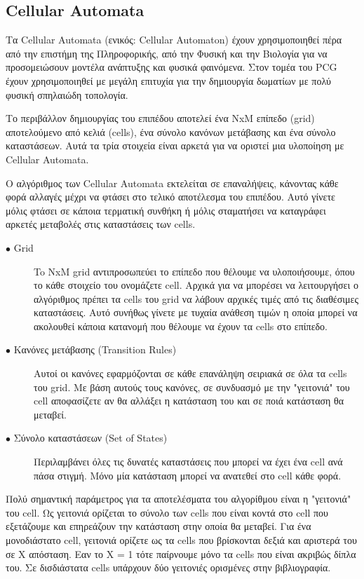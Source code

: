 \subsection{Cellular Automata}
Τα Cellular Automata (ενικός: Cellular Automaton) \cite{cellular} έχουν χρησιμοποιηθεί πέρα από την επιστήμη της Πληροφορικής, από την Φυσική και την Βιολογία για να προσομειώσουν μοντέλα ανάπτυξης και φυσικά φαινόμενα. Στον τομέα του PCG έχουν χρησιμοποιηθεί με μεγάλη επιτυχία για την δημιουργία δωματίων με πολύ φυσική σπηλαιώδη τοπολογία.
\par
Το περιβάλλον δημιουργίας του επιπέδου αποτελεί ένα NxM επίπεδο (grid) αποτελούμενο από κελιά (cells), ένα σύνολο κανόνων μετάβασης και ένα σύνολο καταστάσεων. Αυτά τα τρία στοιχεία είναι αρκετά για να οριστεί μια υλοποίηση με Cellular Automata. 
\par
 Ο αλγόριθμος των Cellular Automata εκτελείται σε επαναλήψεις, κάνοντας κάθε φορά αλλαγές μέχρι να φτάσει στο τελικό αποτέλεσμα του επιπέδου. Αυτό γίνετε μόλις φτάσει σε κάποια τερματική συνθήκη ή μόλις σταματήσει να καταγράφει αρκετές μεταβολές στις καταστάσεις των cells.
\begin{description}
  \item[$\bullet$ Grid] To NxM grid αντιπροσωπεύει το επίπεδο που θέλουμε να υλοποιήσουμε, όπου το κάθε στοιχείο του ονομάζετε cell. Αρχικά για να μπορέσει να λειτουργήσει ο αλγόριθμος πρέπει τα cells του grid να λάβουν αρχικές τιμές από τις διαθέσιμες καταστάσεις. Αυτό συνήθως γίνετε με τυχαία ανάθεση τιμών η οποία μπορεί να ακολουθεί κάποια κατανομή που θέλουμε να έχουν τα cells στο επίπεδο.
  \item[$\bullet$ Κανόνες μετάβασης (Transition Rules)] Αυτοί οι κανόνες εφαρμόζονται σε κάθε επανάληψη σειριακά σε όλα τα cells του grid. Με βάση αυτούς τους κανόνες, σε συνδυασμό με την "γειτονιά" του cell αποφασίζετε αν θα αλλάξει η κατάσταση του και σε ποιά κατάσταση θα μεταβεί.
    \item[$\bullet$ Σύνολο καταστάσεων (Set of States)] Περιλαμβάνει όλες τις δυνατές καταστάσεις που μπορεί να έχει ένα cell ανά πάσα στιγμή. Μόνο μία κατάσταση μπορεί να ανατεθεί στο cell κάθε φορά.
\end{description}
\par
Πολύ σημαντική παράμετρος για τα αποτελέσματα του αλγορίθμου είναι η "γειτονιά" του cell. Ως γειτονιά ορίζεται το σύνολο των cells που είναι κοντά στο cell που εξετάζουμε και επηρεάζουν την κατάσταση στην οποία θα μεταβεί. Για ένα μονοδιάστατο cell, γειτονιά ορίζετε ως τα cells που βρίσκονται δεξιά και αριστερά του σε X απόσταση. Εαν το X = 1 τότε παίρνουμε μόνο τα cells που είναι ακριβώς δίπλα του. Σε δισδιάστατα cells υπάρχουν δύο γειτονιές ορισμένες στην βιβλιογραφία.
